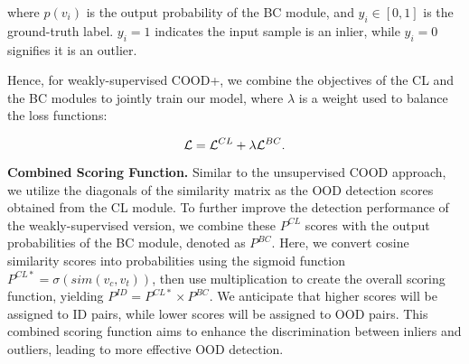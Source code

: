 \noindent where $p(v_i)$ is the output probability of the BC module, and $y_i \in [0, 1]$ is the ground-truth label. $y_i = 1$ indicates the input sample is an inlier, while $y_i = 0$ signifies it is an outlier. 

Hence, for weakly-supervised COOD+, we combine the objectives of the CL and the BC modules to jointly train our model, where $\lambda$ is a weight used to balance the loss functions:

\begin{equation}\small
\label{eq:loss}
    \mathcal{L} = \mathcal{L}^{CL} + \lambda \mathcal{L}^{BC}.
\end{equation}

\noindent\textbf{Combined Scoring Function.}
Similar to the unsupervised COOD approach, we utilize the diagonals of the similarity matrix as the OOD detection scores obtained from the CL module. To further improve the detection performance of the weakly-supervised version, we combine these $P^{CL}$ scores with the output probabilities of the BC module, denoted as $P^{BC}$. Here, we convert cosine similarity scores into probabilities using the sigmoid function $P^{CL*}=\sigma(sim(v_{c},v_{t}))$, then use multiplication to create the overall scoring function, yielding $P^{ID}=P^{CL*}\times P^{BC}$. We anticipate that higher scores will be assigned to ID pairs, while lower scores will be assigned to OOD pairs. This combined scoring function aims to enhance the discrimination between inliers and outliers, leading to more effective OOD detection.